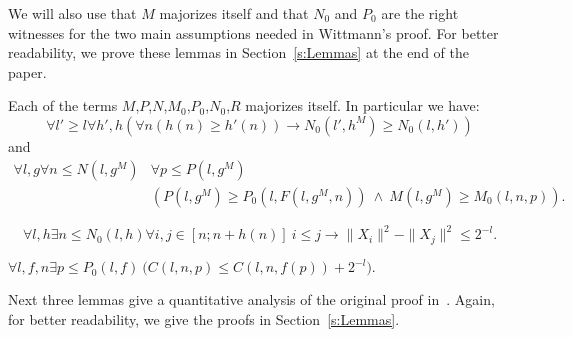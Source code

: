 
We will also use that $M$ majorizes itself and that $N_0$ and $P_0$ are the right witnesses for the two main assumptions needed in Wittmann's proof. For better readability, we prove these lemmas in Section~\ref{s:Lemmas} at the end of the paper.

\begin{lemma}[$M$ is a majorant]\label{l:M}
Each of the terms $M$,$P$,$N$,$M_0$,$P_0$,$N_0$,$R$ majorizes itself.
In particular we have:
\[ \forall l'\geq l\forall h',h ( \forall n (h(n)\geq h'(n)) \rightarrow N_0(l',h^M)\geq N_0(l,h') ) \]
and
\begin{align*}
 \forall l,g \forall n\leq N(l,g^M) &\forall p\leq P(l,g^M)\\
  &( P(l,g^M)\geq P_0(l,F(l,g^M,n))\ \wedge\ M(l,g^M)\geq M_0(l,n,p) ) . 
\end{align*}
\end{lemma}

\begin{lemma}[$N_0$ is correct]\label{l:N0}
\[
\forall l,h \exists n \leq N_0(l,h) \forall i,j\in[n;n+h(n)]\ i\leq j\rightarrow \|X_i\|^2-\|X_j\|^2\leq 2^{-l}.
\]
\end{lemma}

\begin{lemma}[$P_0$ is correct]\label{l:P0}
$
\forall l,f,n\exists p\leq P_0(l,f)\ \big( C(l,n,p)\leq C(l,n,f(p)) + 2^{-l} \big).
$
\end{lemma}

Next three lemmas give a quantitative analysis of the original proof in~\cite{Wittmann90}. Again, for better readability, we 
give the proofs in Section~\ref{s:Lemmas}. 

